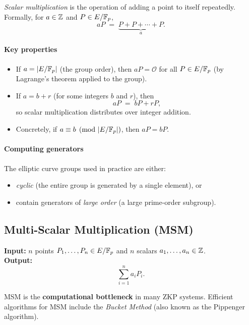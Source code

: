 \documentclass[11pt]{article}
\begin{document}
\emph{Scalar multiplication} is the operation of adding a point to itself
repeatedly. Formally, for $a \in \mathbb{Z}$ and $P \in E/\mathbb{F}_p$,
\[
  aP \;=\; \underbrace{P + P + \cdots + P}_{a}.
\]

\paragraph{Key properties}
\begin{itemize}
  \item If $a = |E/\mathbb{F}_p|$ (the group order), then $aP = \mathcal{O}$ for all
        $P \in E/\mathbb{F}_p$ (by Lagrange's theorem applied to the group).
  \item If $a = b + r$ (for some integers $b$ and $r$), then
        \[
          aP \;=\; bP + rP,
        \]
        so scalar multiplication distributes over integer addition.
  \item Concretely, if $a \equiv b \pmod{|E/\mathbb{F}_p|}$, then $aP = bP$.
\end{itemize}

\paragraph{Computing generators}
The elliptic curve groups used in practice are either:
\begin{itemize}
  \item \emph{cyclic} (the entire group is generated by a single element), or
  \item contain generators of \emph{large order} (a large prime-order subgroup).
\end{itemize}

\subsection{Multi-Scalar Multiplication (MSM)}

\begin{tcolorbox}[colback=gray!8!white, colframe=gray!50!black,
                  title=Multi-Scalar Multiplication]
\textbf{Input:} $n$ points $P_1, \ldots, P_n \in E/\mathbb{F}_p$ and $n$ scalars
$a_1, \ldots, a_n \in \mathbb{Z}$.\\
\textbf{Output:}
\[
  \sum_{i=1}^{n} a_i P_i.
\]
\end{tcolorbox}

MSM is the \textbf{computational bottleneck} in many ZKP systems.
Efficient algorithms for MSM include the \emph{Bucket Method}
(also known as the Pippenger algorithm).
\end{document}

